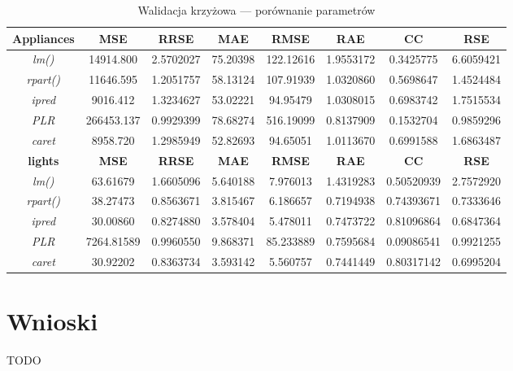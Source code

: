 \documentclass[a4paper,11pt,twoside]{mwrep}  %
\begin{document}
\begin{table}[!h]  \centering
\caption{Walidacja krzyżowa --- porównanie parametrów}
\begin{tabular} { c  c  c  c  c  c  c  c} \hline \hline
    \textbf{Appliances} & \textbf{MSE} & \textbf{RRSE} & \textbf{MAE} & \textbf{RMSE} & \textbf{RAE} & \textbf{CC} & \textbf{RSE} \\ \hline
	\textit{lm()} & 14914.800 & 2.5702027	&  75.20398	& 122.12616	& 1.9553172	& 0.3425775 & 6.6059421 \\
	\textit{rpart()} & 11646.595 &	1.2051757	& 58.13124 & 107.91939 & 1.0320860	& 0.5698647 & 1.4524484 \\
	\textit{ipred} & 9016.412&	1.3234627&	53.02221&	94.95479&	1.0308015&	0.6983742&	1.7515534 \\
	\textit{PLR} & 266453.137	& 0.9929399 &	78.68274&	516.19099&	0.8137909&	0.1532704&	0.9859296 \\
	\textit{caret} & 8958.720& 	1.2985949&	52.82693&	94.65051&	1.0113670&	0.6991588&	1.6863487 \\
    \hline \hline
\textbf{lights} & \textbf{MSE} & \textbf{RRSE} & \textbf{MAE} & \textbf{RMSE} & \textbf{RAE} & \textbf{CC} & \textbf{RSE} \\ \hline
	\textit{lm()} & 63.61679 &	1.6605096 &	5.640188 &	7.976013 &	1.4319283 &	0.50520939 &	2.7572920 \\
	\textit{rpart()} & 38.27473 & 0.8563671 &	3.815467 &	6.186657 &	0.7194938 &	0.74393671 &	0.7333646 \\
	\textit{ipred} & 30.00860 &	0.8274880 &	3.578404 &	5.478011 &	0.7473722 &	0.81096864 &	0.6847364 \\
	\textit{PLR} & 7264.81589 &	0.9960550 &	9.868371 &	85.233889 &	0.7595684 &	0.09086541 &	0.9921255 \\
	\textit{caret} & 30.92202 &	0.8363734 &	3.593142 &	5.560757 &	0.7441449 &	0.80317142 &	0.6995204 \\
    
\end{tabular}
\label{table:wynikiKCV}
\end{table}

\endgroup

\begingroup
\let\clearpage\relax
\chapter{Wnioski}

TODO\\

\endgroup
\end{document}

